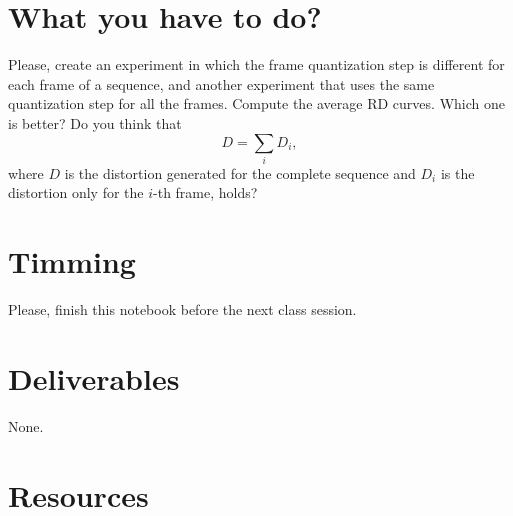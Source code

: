 \section{What you have to do?}

Please, create an experiment in which the frame quantization step is
different for each frame of a sequence, and another experiment that
uses the same quantization step for all the frames. Compute the
average RD curves. Which one is better? Do you think that
\begin{equation*}
  D = \sum_i D_i,
\end{equation*}
where $D$ is the distortion generated for the complete sequence and
$D_i$ is the distortion only for the $i$-th frame, holds?


\section{Timming}

Please, finish this notebook before the next class session.

\section{Deliverables}

None.

\section{Resources}


